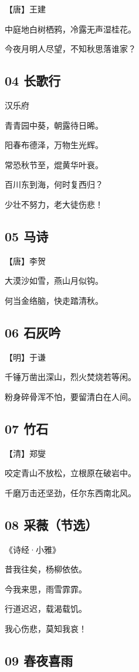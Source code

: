 \documentclass[12pt]{article}
\begin{document}
【唐】王建

中庭地白树栖鸦，冷露无声湿桂花。

今夜月明人尽望，不知秋思落谁家？

\subsection*{04 长歌行}

汉乐府

青青园中葵，朝露待日晞。

阳春布德泽，万物生光辉。

常恐秋节至，焜黄华叶衰。

百川东到海，何时复西归？

少壮不努力，老大徒伤悲！

\subsection*{05 马诗}

【唐】李贺

大漠沙如雪，燕山月似钩。

何当金络脑，快走踏清秋。

\subsection*{06 石灰吟}

【明】于谦

千锤万凿出深山，烈火焚烧若等闲。

粉身碎骨浑不怕，要留清白在人间。

\subsection*{07 竹石}

【清】郑燮

咬定青山不放松，立根原在破岩中。

千磨万击还坚劲，任尔东西南北风。

\subsection*{08 采薇（节选）}

《诗经·小雅》

昔我往矣，杨柳依依。

今我来思，雨雪霏霏。

行道迟迟，载渴载饥。

我心伤悲，莫知我哀！

\subsection*{09 春夜喜雨}
\end{document}
